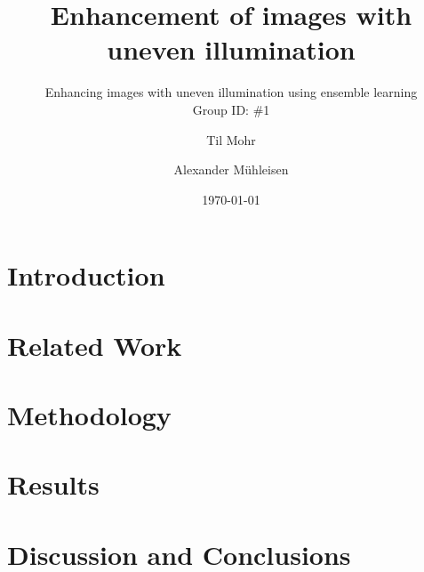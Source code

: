 \documentclass[sigconf]{acmart}
\begin{document}
\title{Enhancement of images with uneven illumination}
\subtitle{Enhancing images with uneven illumination using ensemble learning\\Group ID: \#1}

\author{Til Mohr}
\affiliation{}

\author{Alexander Mühleisen}
\affiliation{}

\date{\today}



\begin{abstract}

\end{abstract}


\renewcommand\footnotetextcopyrightpermission[1]{}
\pagestyle{plain}

\maketitle


\section{Introduction}\label{sec:intro}

\section{Related Work}\label{sec:related}

\section{Methodology}\label{sec:method}

\section{Results}\label{sec:results}


\section{Discussion and Conclusions}








\newpage
\appendix
\end{document}
